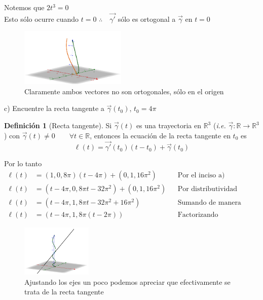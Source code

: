 \documentclass[letterpaper]{article}
\renewcommand{\l}{\ell}
\newcommand{\R}{\mathds{R}}
\renewcommand{\*}{\cdot}
\theoremstyle{definition}
\newtheorem{definition}{Definición}
\begin{document}
 \begin{center}
 Notemos que $ 2t^3 = 0 $\\
 Esto sólo ocurre cuando $ t = 0 $
 $ \therefore \quad \vec{\gamma'}$ sólo es ortogonal a $ \vec{\gamma} $ en $ t= 0 $
 \end{center}
\begin{figure}[h!]
	\centering
	\includegraphics[width=0.45\textwidth]{img/Proyecto4_2.png}
	\caption{Claramente ambos vectores no son ortogonales, sólo en el origen}
\end{figure}
\noindent c) Encuentre la recta tangente a $\vec{\gamma}(t_0)$,  $t_0 = 4\pi$
\begin{definition}[Recta tangente]
	Si $ \vec{\gamma}(t) $ es una trayectoria en $ \R^3 $ (\textit{i.e. } $ \vec{\gamma} : \R \to \R^3 $) con $ \vec{\gamma}(t) \neq 0 \qquad \forall t \in \R$, entonces la ecuación de la recta tangente en $ t_0 $ es 
	\[  \l(t) = \vec{\gamma'}(t_0)(t-t_0) + \vec{\gamma}(t_0)  \]
\end{definition}
Por lo tanto 
\begin{align*}
	\l(t) &= (1,0,8\pi)(t - 4\pi) + (0,1,16\pi^2) && \text{Por el inciso a)}\\
	\l(t) &= (t - 4\pi,0,8\pi t - 32\pi^2) + (0,1,16\pi^2) && \text{Por distributividad}\\
	\l(t) &= (t - 4\pi,1,8\pi t - 32\pi^2 + 16\pi^2) && \text{Sumando de manera directa}\\
	\l(t) &= (t - 4\pi,1,8\pi( t -  2\pi)) && \text{Factorizando}
\end{align*}

\begin{figure}[h!]
	\centering
	\includegraphics[width=0.3\textwidth]{img/Proyecto4_3.png}
	\caption{\small Ajustando los ejes un poco podemos apreciar que efectivamente se trata de la recta tangente }
\end{figure}
\end{document}
